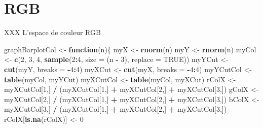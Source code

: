 \documentclass[]{book}
\newenvironment{Shaded}{\begin{snugshade}}{\end{snugshade}}
\newcommand{\KeywordTok}[1]{\textcolor[rgb]{0.13,0.29,0.53}{\textbf{#1}}}
\newcommand{\DataTypeTok}[1]{\textcolor[rgb]{0.13,0.29,0.53}{#1}}
\newcommand{\DecValTok}[1]{\textcolor[rgb]{0.00,0.00,0.81}{#1}}
\newcommand{\StringTok}[1]{\textcolor[rgb]{0.31,0.60,0.02}{#1}}
\newcommand{\OtherTok}[1]{\textcolor[rgb]{0.56,0.35,0.01}{#1}}
\newcommand{\ControlFlowTok}[1]{\textcolor[rgb]{0.13,0.29,0.53}{\textbf{#1}}}
\newcommand{\OperatorTok}[1]{\textcolor[rgb]{0.81,0.36,0.00}{\textbf{#1}}}
\newcommand{\NormalTok}[1]{#1}
\theoremstyle{definition}
\theoremstyle{definition}
\theoremstyle{definition}
\theoremstyle{remark}
\begin{document}
\section{RGB}\label{rgb}

XXX L'espace de couleur RGB

\begin{Shaded}
\begin{Highlighting}[]
\NormalTok{graphBarplotCol <-}\StringTok{ }\ControlFlowTok{function}\NormalTok{(n)\{}
\NormalTok{  myX <-}\StringTok{ }\KeywordTok{rnorm}\NormalTok{(n)}
\NormalTok{  myY <-}\StringTok{ }\KeywordTok{rnorm}\NormalTok{(n)}
\NormalTok{  myCol <-}\StringTok{ }\KeywordTok{c}\NormalTok{(}\DecValTok{2}\NormalTok{, }\DecValTok{3}\NormalTok{, }\DecValTok{4}\NormalTok{, }\KeywordTok{sample}\NormalTok{(}\DecValTok{2}\OperatorTok{:}\DecValTok{4}\NormalTok{, }\DataTypeTok{size =}\NormalTok{ (n }\OperatorTok{-}\StringTok{ }\DecValTok{3}\NormalTok{), }\DataTypeTok{replace =} \OtherTok{TRUE}\NormalTok{))}
\NormalTok{  myYCut <-}\StringTok{ }\KeywordTok{cut}\NormalTok{(myY, }\DataTypeTok{breaks =} \OperatorTok{-}\DecValTok{4}\OperatorTok{:}\DecValTok{4}\NormalTok{)}
\NormalTok{  myXCut <-}\StringTok{ }\KeywordTok{cut}\NormalTok{(myX, }\DataTypeTok{breaks =} \OperatorTok{-}\DecValTok{4}\OperatorTok{:}\DecValTok{4}\NormalTok{)}
\NormalTok{  myYCutCol <-}\StringTok{ }\KeywordTok{table}\NormalTok{(myCol, myYCut)}
\NormalTok{  myXCutCol <-}\StringTok{ }\KeywordTok{table}\NormalTok{(myCol, myXCut)}
\NormalTok{  rColX <-}\StringTok{ }\NormalTok{myXCutCol[}\DecValTok{1}\NormalTok{,] }\OperatorTok{/}\StringTok{ }\NormalTok{(myXCutCol[}\DecValTok{1}\NormalTok{,] }\OperatorTok{+}\StringTok{ }\NormalTok{myXCutCol[}\DecValTok{2}\NormalTok{,] }\OperatorTok{+}\StringTok{ }
\StringTok{    }\NormalTok{myXCutCol[}\DecValTok{3}\NormalTok{,])}
\NormalTok{  gColX <-}\StringTok{ }\NormalTok{myXCutCol[}\DecValTok{2}\NormalTok{,] }\OperatorTok{/}\StringTok{ }\NormalTok{(myXCutCol[}\DecValTok{1}\NormalTok{,] }\OperatorTok{+}\StringTok{ }\NormalTok{myXCutCol[}\DecValTok{2}\NormalTok{,] }\OperatorTok{+}\StringTok{ }
\StringTok{    }\NormalTok{myXCutCol[}\DecValTok{3}\NormalTok{,])}
\NormalTok{  bColX <-}\StringTok{ }\NormalTok{myXCutCol[}\DecValTok{3}\NormalTok{,] }\OperatorTok{/}\StringTok{ }\NormalTok{(myXCutCol[}\DecValTok{1}\NormalTok{,] }\OperatorTok{+}\StringTok{ }\NormalTok{myXCutCol[}\DecValTok{2}\NormalTok{,] }\OperatorTok{+}\StringTok{ }
\StringTok{    }\NormalTok{myXCutCol[}\DecValTok{3}\NormalTok{,])}
\NormalTok{  rColX[}\KeywordTok{is.na}\NormalTok{(rColX)] <-}\StringTok{ }\DecValTok{0}

\end{Highlighting}
\end{Shaded}
\end{document}
